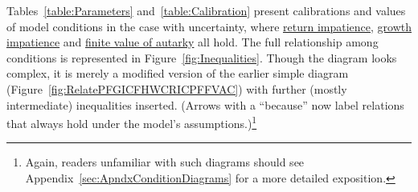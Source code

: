 \documentclass[\econtexRoot/BufferStockTheory]{subfiles}
\begin{document}
Tables~\ref{table:Parameters} and~\ref{table:Calibration} present calibrations and values of model conditions in the case with uncertainty, where \hyperlink{RIC}{return impatience}, \hyperlink{GICRaw}{growth impatience} and \hyperlink{FVAC}{finite value of autarky} all hold.
The full relationship among conditions is represented in Figure~\ref{fig:Inequalities}.
Though the diagram looks complex, it is merely a modified version of the earlier simple diagram (Figure~\ref{fig:RelatePFGICFHWCRICPFFVAC}) with further (mostly intermediate) inequalities inserted.
(Arrows with a ``because'' now label relations that always hold under the model's assumptions.)\footnote{Again, readers unfamiliar with such diagrams should see Appendix~\ref{sec:ApndxConditionDiagrams} for a more detailed exposition.}

\renewcommand{\figName}{Inequalities} 
\renewcommand{\figFile}{\figName} 
\hypertarget{\figFile}{}
\end{document}
